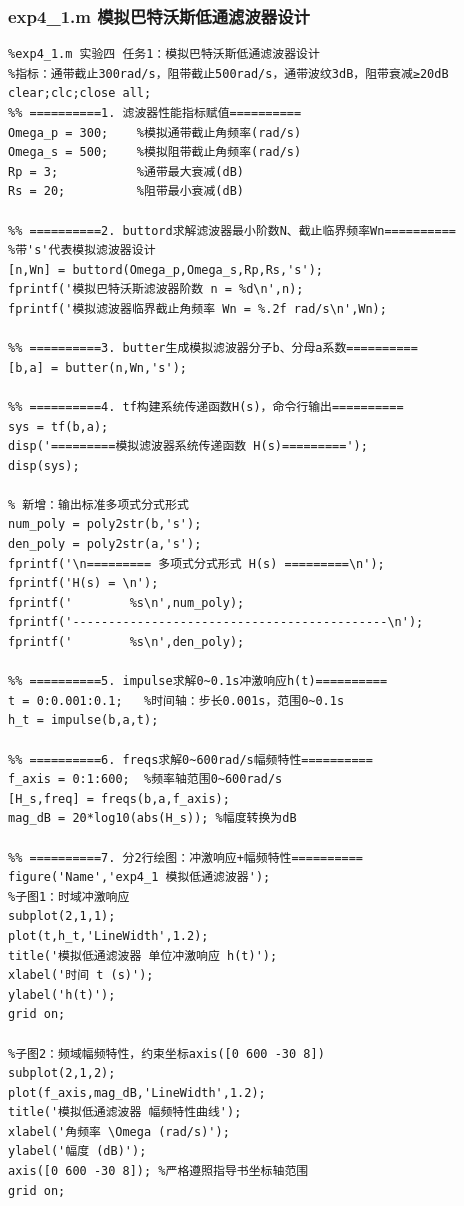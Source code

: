 \subsubsection{exp4\_1.m 模拟巴特沃斯低通滤波器设计}
\begin{lstlisting}
%exp4_1.m 实验四 任务1：模拟巴特沃斯低通滤波器设计
%指标：通带截止300rad/s，阻带截止500rad/s，通带波纹3dB，阻带衰减≥20dB
clear;clc;close all;
%% ==========1. 滤波器性能指标赋值==========
Omega_p = 300;    %模拟通带截止角频率(rad/s)
Omega_s = 500;    %模拟阻带截止角频率(rad/s)
Rp = 3;           %通带最大衰减(dB)
Rs = 20;          %阻带最小衰减(dB)

%% ==========2. buttord求解滤波器最小阶数N、截止临界频率Wn==========
%带's'代表模拟滤波器设计
[n,Wn] = buttord(Omega_p,Omega_s,Rp,Rs,'s');
fprintf('模拟巴特沃斯滤波器阶数 n = %d\n',n);
fprintf('模拟滤波器临界截止角频率 Wn = %.2f rad/s\n',Wn);

%% ==========3. butter生成模拟滤波器分子b、分母a系数==========
[b,a] = butter(n,Wn,'s');

%% ==========4. tf构建系统传递函数H(s)，命令行输出==========
sys = tf(b,a);
disp('=========模拟滤波器系统传递函数 H(s)=========');
disp(sys);

% 新增：输出标准多项式分式形式
num_poly = poly2str(b,'s');
den_poly = poly2str(a,'s');
fprintf('\n========= 多项式分式形式 H(s) =========\n');
fprintf('H(s) = \n');
fprintf('        %s\n',num_poly);
fprintf('--------------------------------------------\n');
fprintf('        %s\n',den_poly);

%% ==========5. impulse求解0~0.1s冲激响应h(t)==========
t = 0:0.001:0.1;   %时间轴：步长0.001s，范围0~0.1s
h_t = impulse(b,a,t);

%% ==========6. freqs求解0~600rad/s幅频特性==========
f_axis = 0:1:600;  %频率轴范围0~600rad/s
[H_s,freq] = freqs(b,a,f_axis);
mag_dB = 20*log10(abs(H_s)); %幅度转换为dB

%% ==========7. 分2行绘图：冲激响应+幅频特性==========
figure('Name','exp4_1 模拟低通滤波器');
%子图1：时域冲激响应
subplot(2,1,1);
plot(t,h_t,'LineWidth',1.2);
title('模拟低通滤波器 单位冲激响应 h(t)');
xlabel('时间 t (s)');
ylabel('h(t)');
grid on;

%子图2：频域幅频特性，约束坐标axis([0 600 -30 8])
subplot(2,1,2);
plot(f_axis,mag_dB,'LineWidth',1.2);
title('模拟低通滤波器 幅频特性曲线');
xlabel('角频率 \Omega (rad/s)');
ylabel('幅度 (dB)');
axis([0 600 -30 8]); %严格遵照指导书坐标轴范围
grid on;
\end{lstlisting}

